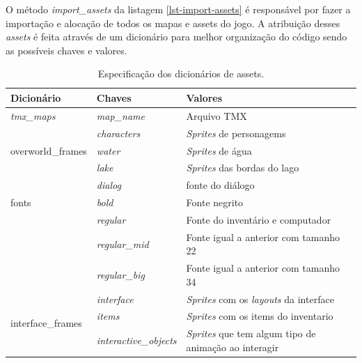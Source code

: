 
\clearpage
O método \textit{import\_assets} da listagem \ref{lst-import-assets} é responsável por fazer a importação e alocação de todos os mapas e assets do jogo. A atribuição desses \textit{assets} é feita através de um dicionário para melhor organização do código sendo as possíveis chaves e valores.


\begin{table}[h!]
	\caption{Especificação dos dicionários de assets.}
	\label{tbl-especificacao-dicionario}
	\centering
	\renewcommand{\arraystretch}{2}
	\begin{small}
		\begin{tabular}{ | p{35mm} | p{35mm} | p{65mm} |}\hline \rowcolor{MidnightBlue}
                \hline
                Dicionário & Chaves & Valores \\
                \hline
                \textit{tmx\_maps} & \textit{map\_name} & Arquivo TMX \\ 
                \hline
                \multirow{3}{4em}{overworld\_frames} 
                & \textit{characters} & \textit{Sprites} de personagems \\ 
                & \textit{water} & \textit{Sprites} de água \\ 
                & \textit{lake} & \textit{Sprites} das bordas do lago \\ 
                \hline
                \multirow{3}{4em}{fonts} 
                & \textit{dialog} & fonte do diálogo \\ 
                & \textit{bold} & Fonte negrito \\ 
                & \textit{regular} & Fonte do inventário e computador \\ 
                & \textit{regular\_mid} & Fonte igual a anterior com tamanho 22 \\ 
                & \textit{regular\_big} & Fonte igual a anterior com tamanho 34 \\ 
                \hline
                \multirow{3}{4em}{interface\_frames} 
                & \textit{interface} & \textit{Sprites} com os \textit{layouts} da interface \\ 
                & \textit{items} & \textit{Sprites} com os items do inventario \\ 
                & \textit{interactive\_objects} & \textit{Sprites} que tem algum tipo de animação ao interagir \\ 
                \hline

                \end{tabular}
	\end{small}
\end{table}

